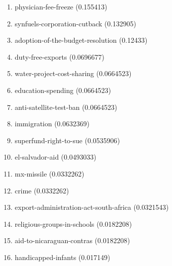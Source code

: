 \begin{enumerate}
\item physician-fee-freeze (0.155413)
\item synfuels-corporation-cutback (0.132905)
\item adoption-of-the-budget-resolution (0.12433)
\item duty-free-exports (0.0696677)
\item water-project-cost-sharing (0.0664523)
\item education-spending (0.0664523)
\item anti-satellite-test-ban (0.0664523)
\item immigration (0.0632369)
\item superfund-right-to-sue (0.0535906)
\item el-salvador-aid (0.0493033)
\item mx-missile (0.0332262)
\item crime (0.0332262)
\item export-administration-act-south-africa (0.0321543)
\item religious-groups-in-schools (0.0182208)
\item aid-to-nicaraguan-contras (0.0182208)
\item handicapped-infants (0.017149)
\end{enumerate}